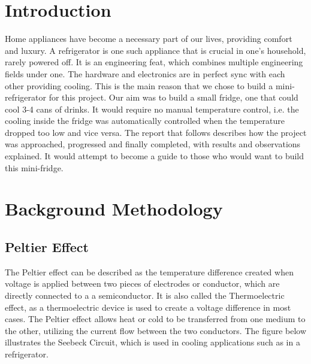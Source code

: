 \documentclass[12pt,onecolumn]{article}
\begin{document}

\newpage
\tableofcontents

\newpage
\section{Introduction}
Home appliances have become a necessary part of our lives, providing comfort and luxury. A refrigerator is one such appliance that is crucial in one's household, rarely powered off. It is an engineering feat, which combines multiple engineering fields under one. The hardware and electronics are in perfect sync with each other providing cooling. This is the main reason that we chose to build a mini-refrigerator for this project. Our aim was to build a small fridge, one that could cool 3-4 cans of drinks. It would require no manual temperature control, i.e. the cooling inside the fridge was automatically controlled when the temperature dropped too low and vice versa. The report that follows describes how the project was approached, progressed and finally completed, with results and observations explained. It would attempt to become a guide to those who would want to build this mini-fridge. 

\section{Background Methodology}
\subsection{Peltier Effect}
The Peltier effect can be described as the temperature difference created when voltage is applied between two pieces of electrodes or conductor, which are directly connected to a a semiconductor. It is also called the Thermoelectric effect, as a thermoelectric device is used to create a voltage difference in most cases. The Peltier effect allows heat or cold to be transferred from one medium to the other, utilizing the current flow between the two conductors. The figure below illustrates the Seebeck Circuit, which is used in cooling applications such as in a refrigerator. 
\end{document}
